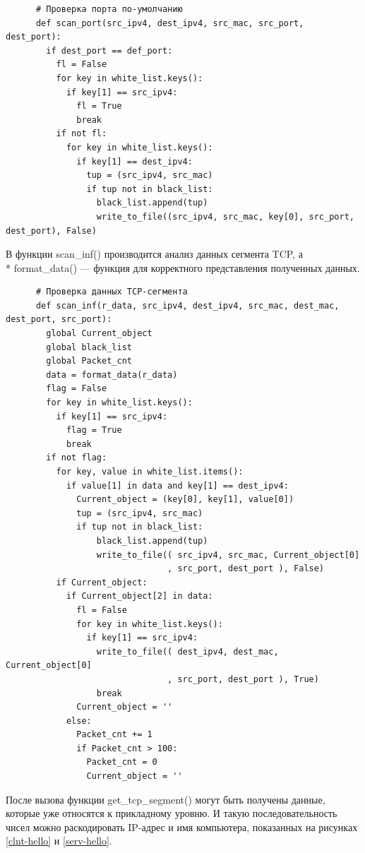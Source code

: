 \documentclass[bachelor, och, coursework]{SCWorks}
\begin{document}
    \begin{verbatim}
      # Проверка порта по-умолчанию
      def scan_port(src_ipv4, dest_ipv4, src_mac, src_port, dest_port):
        if dest_port == def_port:
          fl = False
          for key in white_list.keys():
            if key[1] == src_ipv4:
              fl = True
              break
          if not fl:
            for key in white_list.keys():
              if key[1] == dest_ipv4:
                tup = (src_ipv4, src_mac)    
                if tup not in black_list:
                  black_list.append(tup)
                  write_to_file((src_ipv4, src_mac, key[0], src_port, dest_port), False)
    \end{verbatim}

    В функции scan_inf() производится анализ данных сегмента TCP, а \\* format_data() --- функция для корректного представления полученных данных.

    \begin{verbatim}
      # Проверка данных TCP-сегмента
      def scan_inf(r_data, src_ipv4, dest_ipv4, src_mac, dest_mac, dest_port, src_port):
        global Current_object
        global black_list
        global Packet_cnt
        data = format_data(r_data)
        flag = False
        for key in white_list.keys():
          if key[1] == src_ipv4:
            flag = True
            break
        if not flag:
          for key, value in white_list.items():
            if value[1] in data and key[1] == dest_ipv4:
              Current_object = (key[0], key[1], value[0])
              tup = (src_ipv4, src_mac)
              if tup not in black_list:
                  black_list.append(tup)
                  write_to_file(( src_ipv4, src_mac, Current_object[0]
                                , src_port, dest_port ), False)
          if Current_object:
            if Current_object[2] in data:
              fl = False
              for key in white_list.keys():
                if key[1] == src_ipv4:
                  write_to_file(( dest_ipv4, dest_mac, Current_object[0]
                                , src_port, dest_port ), True)
                  break
              Current_object = ''
            else:
              Packet_cnt += 1
              if Packet_cnt > 100:
                Packet_cnt = 0
                Current_object = '' 
    \end{verbatim}
    
    После вызова функции get_tcp_segment() могут быть получены данные, которые уже относятся к прикладному уровню. И такую последовательность чисел
    можно раскодировать IP-адрес и имя компьютера, показанных на рисунках \ref{clnt-hello} и \ref{serv-hello}.
\end{document}
